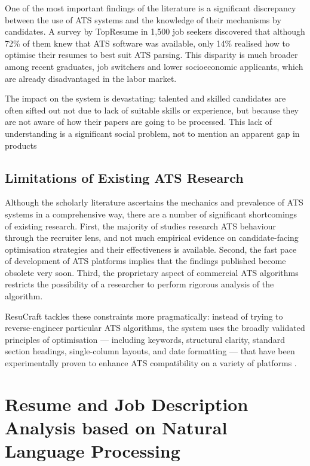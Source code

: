\documentclass[12pt, a4paper, oneside]{report}
\begin{document}
One of the most important findings of the literature is a significant discrepancy between the use of ATS systems and the knowledge of their mechanisms by candidates. A survey by TopResume\cite{topresume2021} in 1,500 job seekers discovered that although 72\% of them knew that ATS software was available, only 14\% realised how to optimise their resumes to best suit ATS parsing. This disparity is much broader among recent graduates, job switchers and lower socioeconomic applicants, which are already disadvantaged in the labor market.

The impact on the system is devastating: talented and skilled candidates are often sifted out not due to lack of suitable skills or experience, but because they are not aware of how their papers are going to be processed. This lack of understanding is a significant social problem, not to mention an apparent gap in products

\subsection{Limitations of Existing ATS Research}

Although the scholarly literature ascertains the mechanics and prevalence of ATS systems in a comprehensive way, there are a number of significant shortcomings of existing research. First, the majority of studies research ATS behaviour through the recruiter lens, and not much empirical evidence on candidate-facing optimisation strategies and their effectiveness is available. Second, the fast pace of development of ATS platforms implies that the findings published become obsolete very soon. Third, the proprietary aspect of commercial ATS algorithms restricts the possibility of a researcher to perform rigorous analysis of the algorithm.

ResuCraft tackles these constraints more pragmatically: instead of trying to reverse-engineer particular ATS algorithms, the system uses the broadly validated principles of optimisation --- including keywords, structural clarity, standard section headings, single-column layouts, and date formatting --- that have been experimentally proven to enhance ATS compatibility on a variety of platforms \cite{resumeworded2022}.

\section{Resume and Job Description Analysis based on Natural Language Processing}
\end{document}
